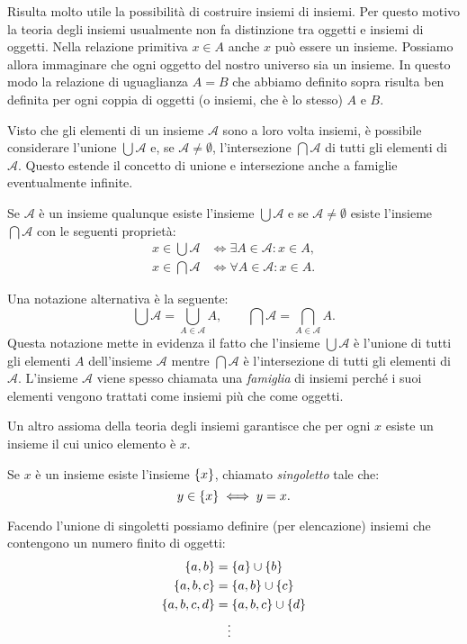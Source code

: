 Risulta molto utile la possibilità di costruire insiemi di insiemi.
Per questo motivo la teoria degli insiemi usualmente non fa distinzione
tra oggetti e insiemi di oggetti. Nella relazione primitiva $x\in A$ anche
$x$ può essere un insieme. Possiamo allora immaginare che ogni oggetto del
nostro universo sia un insieme. In questo modo la relazione di uguaglianza $A=B$
che abbiamo definito sopra risulta ben definita per ogni coppia di oggetti
(o insiemi, che è lo stesso) $A$ e $B$.

Visto che gli elementi di un insieme $\mathcal A$ sono a loro volta insiemi,
è possibile considerare l'unione $\bigcup \mathcal A$
e, se 
$\mathcal A \neq \emptyset$, l'intersezione $\bigcap \mathcal A$ di tutti gli elementi
di $\mathcal A$.
Questo estende il concetto di unione e intersezione anche a famiglie
eventualmente infinite.

\begin{axiom}
Se $\mathcal A$ è un insieme qualunque esiste l'insieme $\bigcup \mathcal A$
e se $\mathcal A \neq \emptyset$ esiste l'insieme $\bigcap \mathcal A$
con le seguenti proprietà:
\begin{align*}
  x \in \bigcup \mathcal A & \iff \exists A \in \mathcal A \colon x\in A, \\
  x \in \bigcap \mathcal A & \iff \forall A \in \mathcal A \colon x\in A.
\end{align*}
\end{axiom}
Una notazione alternativa è la seguente:
\[
 \bigcup \mathcal A = \bigcup_{A\in \mathcal A} A, \qquad 
 \bigcap \mathcal A = \bigcap_{A\in \mathcal A} A.  
\]
Questa notazione mette in evidenza il fatto che l'insieme 
$\bigcup \mathcal A$ è l'unione di tutti gli elementi $A$ dell'insieme 
$\mathcal A$ mentre $\bigcap \mathcal A$ è l'intersezione 
di tutti gli elementi di $\mathcal A$.
L'insieme $\mathcal A$ viene spesso chiamata una \emph{famiglia}
di insiemi perché i suoi elementi vengono trattati come insiemi 
più che come oggetti.

Un altro assioma della teoria degli insiemi garantisce che per ogni
$x$ esiste un insieme il cui unico elemento è $x$. 
\begin{axiom}[singoletto]
  Se $x$ è un insieme esiste l'insieme ${\left\{ x \right\}}$, 
  chiamato \emph{singoletto}%
%
  tale che:
  \[
    y \in {\left\{ x \right\}} \iff y=x.
  \]
\end{axiom}
Facendo l'unione di singoletti possiamo definire (per elencazione) insiemi che contengono
un numero finito di oggetti:
\begin{align*}
  {\left\{ a,b \right\}} &= {\left\{ a \right\}} \cup {\left\{ b \right\}} \\
  {\left\{ a, b, c \right\}} &= {\left\{ a,b \right\}} \cup {\left\{ c \right\}}\\
  {\left\{ a, b, c, d \right\}} &= {\left\{ a,b,c \right\}} \cup {\left\{ d \right\}}\\
  &\quad\vdots
\end{align*}

